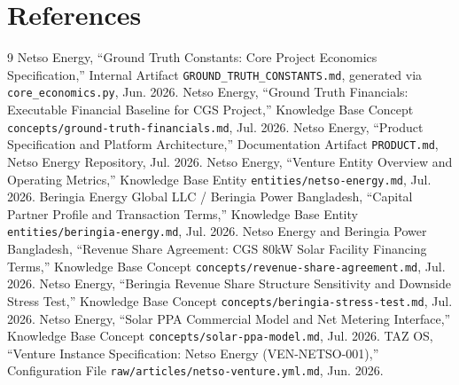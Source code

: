 \documentclass[11pt,a4paper]{article}
\begin{document}
\section*{References}
\begin{thebibliography}{9}
 Netso Energy, ``Ground Truth Constants: Core Project Economics Specification,'' Internal Artifact \texttt{GROUND\_TRUTH\_CONSTANTS.md}, generated via \texttt{core\_economics.py}, Jun. 2026.
 Netso Energy, ``Ground Truth Financials: Executable Financial Baseline for CGS Project,'' Knowledge Base Concept \texttt{concepts/ground-truth-financials.md}, Jul. 2026.
 Netso Energy, ``Product Specification and Platform Architecture,'' Documentation Artifact \texttt{PRODUCT.md}, Netso Energy Repository, Jul. 2026.
 Netso Energy, ``Venture Entity Overview and Operating Metrics,'' Knowledge Base Entity \texttt{entities/netso-energy.md}, Jul. 2026.
 Beringia Energy Global LLC / Beringia Power Bangladesh, ``Capital Partner Profile and Transaction Terms,'' Knowledge Base Entity \texttt{entities/beringia-energy.md}, Jul. 2026.
 Netso Energy and Beringia Power Bangladesh, ``Revenue Share Agreement: CGS 80kW Solar Facility Financing Terms,'' Knowledge Base Concept \texttt{concepts/revenue-share-agreement.md}, Jul. 2026.
 Netso Energy, ``Beringia Revenue Share Structure Sensitivity and Downside Stress Test,'' Knowledge Base Concept \texttt{concepts/beringia-stress-test.md}, Jul. 2026.
 Netso Energy, ``Solar PPA Commercial Model and Net Metering Interface,'' Knowledge Base Concept \texttt{concepts/solar-ppa-model.md}, Jul. 2026.
 TAZ OS, ``Venture Instance Specification: Netso Energy (VEN-NETSO-001),'' Configuration File \texttt{raw/articles/netso-venture.yml.md}, Jun. 2026.
\end{thebibliography}
\end{document}
